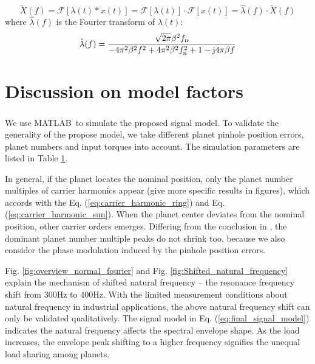 \documentclass[a4paper,fleqn]{cas-sc}%
\begin{document}
\begin{equation}
        \widetilde{X}(f)= \mathcal{F}\left[\lambda(t) \ast x(t) \right]
                    = \mathcal{F}\left[\lambda(t)\right] \cdot \mathcal{F}\left[x(t)\right]
                    = \hat{\lambda}(f) \cdot \widetilde{X}(f)
\end{equation}
where $\hat{\lambda}(f)$ is the Fourier transform of $\lambda(t)$:
\begin{equation}
    \hat{\lambda}(f)=\frac{\sqrt{2 \pi } \beta ^2 f_{\rm n}}{-4 \pi ^2 \beta ^2 f^2  + 4 \pi ^2 \beta ^2 f_{\rm n}^2+1 - {\rm j} 4 \pi  \beta  f}
\end{equation}
\section{Discussion on model factors\label{sec:factor_discussion}}
\par We use MATLAB\textsuperscript \textregistered \ to simulate the proposed signal model. To validate the generality of the propose model, we take different planet pinhole position errors, planet numbers and input torques into account. The simulation parameters are listed in Table \ref{}.
\par In general, if the planet locates the nominal position, only the planet number multiples of carrier harmonics appear (give more specific results in figures), which accords with the Eq. (\ref{eq:carrier_harmonic_ring}) and Eq. (\ref{eq:carrier_harmonic_sun}). When the planet center deviates from the nominal position, other carrier orders emerges. Differing from the conclusion in \cite{Mark2009}, the dominant planet number multiple peaks do not shrink too, because we also consider the phase modulation induced by the pinhole position errors. 
\par Fig. \ref{fig:overview_normal_fourier} and Fig. \ref{fig:Shifted_natural_frequency} explain the mechanism of shifted natural frequency -- the resonance frequency shift from 300Hz to 400Hz. With the limited measurement conditions about natural frequency in industrial applications, the above natural frequency shift can only be validated qualitatively. The signal model in Eq. (\ref{eq:final_signal_model}) indicates the natural frequency affects the spectral envelope shape. As the load increases, the envelope peak shifting to a higher frequency signifies the unequal load sharing among planets. 
\end{document}
